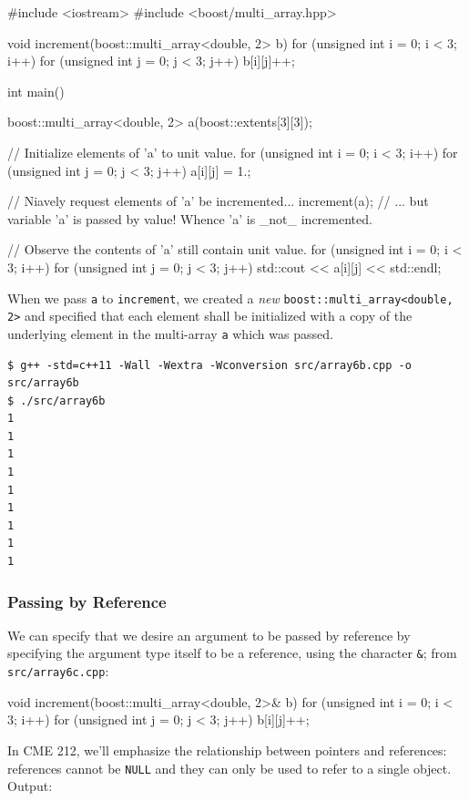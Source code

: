 \documentclass[12pt,letterpaper,twoside]{article}
\begin{document}
\begin{cpp}
#include <iostream>
#include <boost/multi_array.hpp>

void increment(boost::multi_array<double, 2> b) {
  for (unsigned int i = 0; i < 3; i++)
    for (unsigned int j = 0; j < 3; j++)
      b[i][j]++;
}

int main() {
  boost::multi_array<double, 2> a(boost::extents[3][3]);

  // Initialize elements of 'a' to unit value.
  for (unsigned int i = 0; i < 3; i++)
    for (unsigned int j = 0; j < 3; j++)
      a[i][j] = 1.;
      
  // Niavely request elements of 'a' be incremented...
  increment(a);    // ... but variable 'a' is passed by value! Whence 'a' is _not_ incremented.

  // Observe the contents of 'a' still contain unit value.
  for (unsigned int i = 0; i < 3; i++)
    for (unsigned int j = 0; j < 3; j++)
      std::cout << a[i][j] << std::endl;
}
\end{cpp}

When we pass \texttt{a} to \texttt{increment}, we created a \emph{new} 
\texttt{boost::multi\_array<double, 2>} and specified that each element shall be initialized
with a copy of the underlying element in the multi-array \texttt{a} which was passed.

\begin{verbatim}
$ g++ -std=c++11 -Wall -Wextra -Wconversion src/array6b.cpp -o src/array6b
$ ./src/array6b
1
1
1
1
1
1
1
1
1
\end{verbatim}

\subsubsection{Passing by Reference}
We can specify that we desire an argument to be passed by reference by specifying the argument type
itself to be a reference, using the character \texttt{\&};
from \texttt{src/array6c.cpp}:

\begin{cpp}
void increment(boost::multi_array<double, 2>& b) {
  for (unsigned int i = 0; i < 3; i++) {
    for (unsigned int j = 0; j < 3; j++) {
      b[i][j]++;
    }
  }
}
\end{cpp}

In CME 212, we'll emphasize the relationship between pointers and references: references cannot be 
\texttt{NULL} and they can only be used to refer to a single object.
Output:
\end{document}
